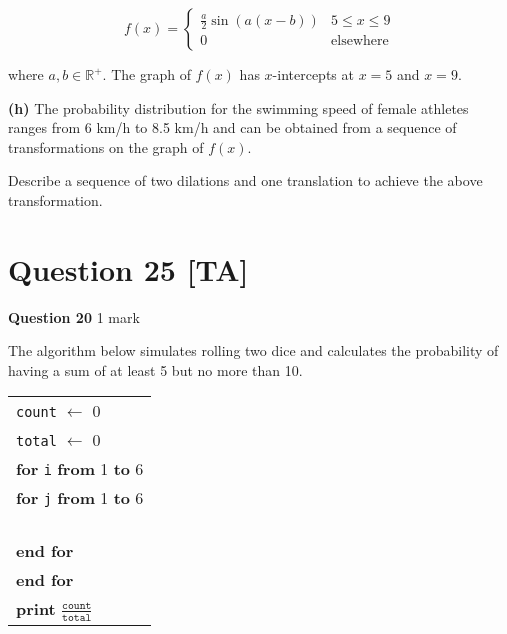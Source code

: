 \documentclass[10pt,a4paper]{article}
\begin{document}
\[
f(x) = \begin{cases}
\frac{a}{2}\sin(a(x - b)) & 5 \leq x \leq 9\\
0 & \text{elsewhere}
\end{cases}
\]

where $a, b \in \mathbb{R}^+$. The graph of $f(x)$ has $x$-intercepts at $x = 5$ and $x = 9$.

\vspace{9\baselineskip}

\textbf{(h)} The probability distribution for the swimming speed of female athletes ranges from 6 km/h to 8.5 km/h and can be obtained from a sequence of transformations on the graph of $f(x)$.

Describe a sequence of two dilations and one translation to achieve the above transformation.

\vspace{9\baselineskip}

\hrulefill

\section*{Question 25 [TA]}

\textbf{Question 20} \hfill 1 mark

The algorithm below simulates rolling two dice and calculates the probability of having a sum of at least 5 but no more than 10.

\begin{center}
\begin{tabular}{l}
\texttt{count} $\leftarrow$ 0 \\
\texttt{total} $\leftarrow$ 0 \\
\textbf{for} \texttt{i} \textbf{from} 1 \textbf{to} 6 \\
\quad \textbf{for} \texttt{j} \textbf{from} 1 \textbf{to} 6 \\
\quad \quad \underline{\hspace{8cm}} \\
\quad \quad \underline{\hspace{8cm}} \\
\quad \quad \underline{\hspace{8cm}} \\
\quad \quad \underline{\hspace{8cm}} \\
\quad \textbf{end for} \\
\textbf{end for} \\
\textbf{print} $\frac{\texttt{count}}{\texttt{total}}$
\end{tabular}
\end{center}
\end{document}
